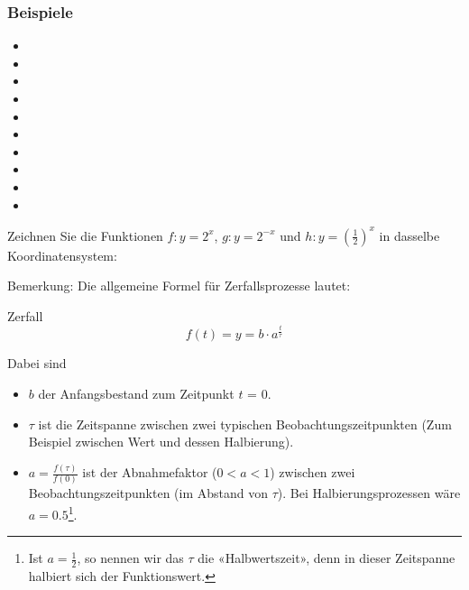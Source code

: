 \subsubsection{Beispiele}
\begin{itemize}
	\item {}
	\item {}
	\item {}
	\item {}
  \item {}
  \item {}
  \item {}
  \item {}
  \item {}
  \item \Lueckentext{\dotfill}
\end{itemize}

\newpage



Zeichnen Sie die Funktionen $f: y=2^x$, $g: y=2^{-x}$ und $h: y=\left(\frac12\right)^x$ in dasselbe Koordinatensystem:


Bemerkung: 
\newpage
Die allgemeine Formel für Zerfallsprozesse lautet:

\begin{definition}{Zerfall}{}
$$f(t) = y = b\cdot{}a^{\frac{t}{\tau}}$$
\end{definition}


Dabei sind
\begin{itemize}
\item $b$ der Anfangsbestand zum Zeitpunkt $t$ = 0.
\item $\tau$ ist die Zeitspanne zwischen zwei typischen Beobachtungszeitpunkten (Zum Beispiel zwischen Wert und dessen Halbierung).
\item $a=\frac{f(\tau)}{f(0)}$ ist der Abnahmefaktor ($0<a<1$)
  zwischen zwei Beobachtungszeitpunkten (im Abstand von $\tau$). Bei
  Halbierungsprozessen \zB wäre $a=0.5$\footnote{Ist $a=\frac12$, so
  nennen wir das $\tau$ die «Halbwertszeit», denn
  in dieser Zeitspanne halbiert sich der Funktionswert.}.
\end{itemize}

